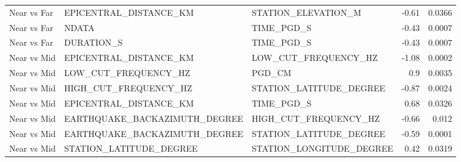 \begin{table}[H]
\begin{tabular}{lllrr}
Near vs Far & EPICENTRAL_DISTANCE_KM & STATION_ELEVATION_M & -0.61 & 0.0366 \\
Near vs Far & NDATA & TIME_PGD_S & -0.43 & 0.0007 \\
Near vs Far & DURATION_S & TIME_PGD_S & -0.43 & 0.0007 \\
Near vs Mid & EPICENTRAL_DISTANCE_KM & LOW_CUT_FREQUENCY_HZ & -1.08 & 0.0002 \\
Near vs Mid & LOW_CUT_FREQUENCY_HZ & PGD_CM & 0.9 & 0.0035 \\
Near vs Mid & HIGH_CUT_FREQUENCY_HZ & STATION_LATITUDE_DEGREE & -0.87 & 0.0024 \\
Near vs Mid & EPICENTRAL_DISTANCE_KM & TIME_PGD_S & 0.68 & 0.0326 \\
Near vs Mid & EARTHQUAKE_BACKAZIMUTH_DEGREE & HIGH_CUT_FREQUENCY_HZ & -0.66 & 0.012 \\
Near vs Mid & EARTHQUAKE_BACKAZIMUTH_DEGREE & STATION_LATITUDE_DEGREE & -0.59 & 0.0001 \\
Near vs Mid & STATION_LATITUDE_DEGREE & STATION_LONGITUDE_DEGREE & 0.42 & 0.0319 \\
\bottomrule
\end{tabular}
\end{table}